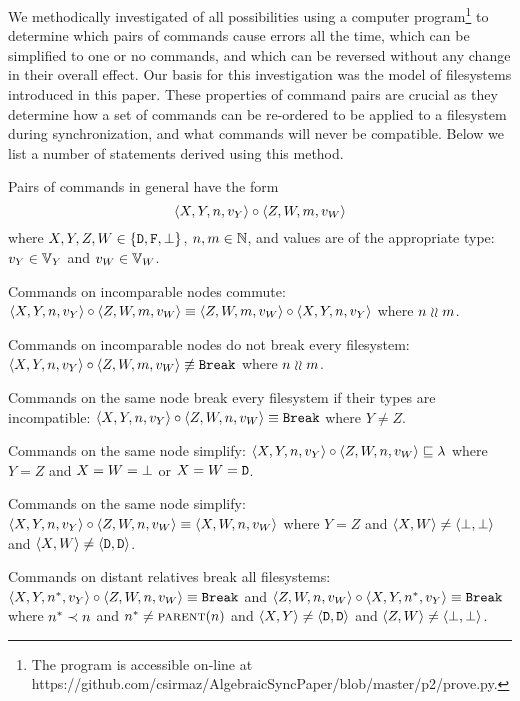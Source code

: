 We methodically investigated of all possibilities using a computer 
program\footnote{The program is accessible on-line at \\
https://github.com/csirmaz/AlgebraicSyncPaper/blob/master/p2/prove.py.}
to determine
which pairs of commands cause errors all the time,
which can be simplified to one or no commands, and which can be reversed
without any change in their overall effect.
Our basis for this investigation was the model of filesystems introduced in this paper.
These properties of command pairs are crucial as they determine
how a set of commands can be re-ordered to be applied to a filesystem
during synchronization, and what commands will never be compatible.
Below we list a number of statements derived using this method.

\bigskip

\noindent
Pairs of commands in general have the form
\[ \langle{X,Y,n,v_Y}\rangle\circ  \langle{Z,W,m,v_W}\rangle \]
where $X,Y,Z,W\in\{\mathtt{D},\mathtt{F},\bot\}$, $n,m\in\mathbb{N}$, 
and values are of the appropriate type: 
$v_Y\in\mathbb{V}_{Y}$ and $v_W\in\mathbb{V}_{W}$.

\begin{myax}\label{ax_separate_commute}
Commands on incomparable nodes commute:
$\langle{X,Y,n,v_Y}\rangle\circ\langle{Z,W,m,v_W}\rangle \equiv \langle{Z,W,m,v_W}\rangle\circ\langle{X,Y,n,v_Y}\rangle$ where $n\mathrel{\wr\wr} m$.
\end{myax}

\begin{myax}\label{ax_separate_nobreaks}
Commands on incomparable nodes do not break every filesystem:
$\langle{X,Y,n,v_Y}\rangle\circ\langle{Z,W,m,v_W}\rangle \not\equiv \mathtt{Break}$ where $n\mathrel{\wr\wr} m$.
\end{myax}

\begin{myax}\label{ax_same_breaks}
Commands on the same node break every filesystem if their types are incompatible:
$\langle{X,Y,n,v_Y}\rangle\circ\langle{Z,W,n,v_W}\rangle \equiv \mathtt{Break}$ where $Y\ne Z$.
\end{myax}

\begin{myax}\label{ax_same_emptyseq}
Commands on the same node simplify:
$\langle{X,Y,n,v_Y}\rangle\circ\langle{Z,W,n,v_W}\rangle \sqsubseteq \lambda$ where $Y=Z$ and $X=W=\bot$ 
or $X=W=\mathtt{D}$.
\end{myax}

\begin{myax}\label{ax_same_singlec}
Commands on the same node simplify:
$\langle{X,Y,n,v_Y}\rangle\circ \langle{Z,W,n,v_W}\rangle \equiv \langle{X,W,n,v_W}\rangle$ where $Y=Z$ and $\langle{X,W}\rangle\neq\langle{\bot,\bot}\rangle$ and $\langle{X,W}\rangle\neq\langle{\mathtt{D},\mathtt{D}}\rangle$.
\end{myax}

\begin{myax}\label{ax_distantrel_breaks}
Commands on distant relatives break all filesystems:
$\langle{X,Y,n^*,v_Y}\rangle\circ\langle{Z,W,n,v_W}\rangle \equiv \mathtt{Break}$
and $\langle{Z,W,n,v_W}\rangle\circ\langle{X,Y,n^*,v_Y}\rangle \equiv\mathtt{Break}$
where $n^*\prec n$ and $n^*\neq\text{\normalfont\scshape{parent}}(n)$ and $\langle{X,Y}\rangle\neq\langle{\mathtt{D},\mathtt{D}}\rangle$ and $\langle{Z,W}\rangle\neq\langle{\bot,\bot}\rangle$.
\end{myax}

